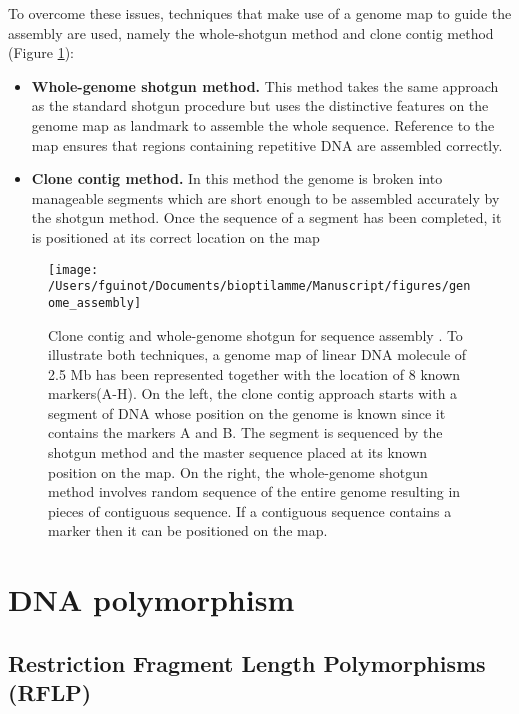 \documentclass[]{book}
\begin{document}
To overcome these issues, techniques that make use of a genome map to
guide the assembly are used, namely the whole-shotgun method and clone
contig method (Figure \ref{fig:genomeassembly}):

\begin{itemize}
\item
  \textbf{Whole-genome shotgun method.} This method takes the same approach
  as the standard shotgun procedure but uses the distinctive features
  on the genome map as landmark to assemble the whole sequence.
  Reference to the map ensures that regions containing repetitive DNA
  are assembled correctly.
\item
  \textbf{Clone contig method.} In this method the genome is broken into
  manageable segments which are short enough to be assembled
  accurately by the shotgun method. Once the sequence of a segment has
  been completed, it is positioned at its correct location on the map
\end{itemize}



\begin{figure}

{\centering \texttt{[image: /Users/fguinot/Documents/bioptilamme/Manuscript/figures/genome\_assembly]} 

}

\caption{Clone contig and whole-genome shotgun for sequence assembly \citep{brown2007genomes}. To illustrate both techniques, a genome map of linear DNA molecule of 2.5 Mb has been represented together with the location of 8 known markers(A-H). On the left, the clone contig approach starts with a segment of DNA whose position on the genome is known since it contains the markers A and B. The segment is sequenced by the shotgun method and the master sequence placed at its known position on the map. On the right, the whole-genome shotgun method involves random sequence of the entire genome resulting in pieces of contiguous sequence. If a contiguous sequence contains a marker then it can be positioned on the map.}\label{fig:genomeassembly}
\end{figure}

\hypertarget{dna-polymorphism}{%
\section{DNA polymorphism}\label{dna-polymorphism}}

\hypertarget{restriction-fragment-length-polymorphisms-rflp}{%
\subsection{Restriction Fragment Length Polymorphisms (RFLP)}\label{restriction-fragment-length-polymorphisms-rflp}}
\end{document}
